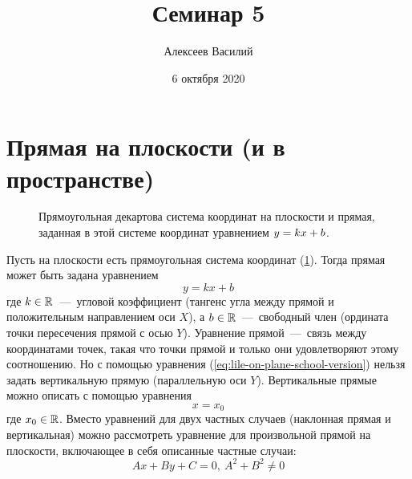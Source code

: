 \documentclass[a4paper,12pt]{article}
\author{Алексеев Василий}
\title{Семинар 5}
\date{6 октября 2020}
\begin{document}
  \maketitle
  
  \tableofcontents

  \thispagestyle{empty}
  
  \newpage
  


  \section{Прямая на плоскости (и в пространстве)}
  
  \begin{figure}[h]
    \centering
    
    
    \caption{Прямоугольная декартова система координат на плоскости и прямая, заданная в этой системе координат уравнением $y \hm= kx \hm+ b$.}
    \label{fig:line-on-plane}
  \end{figure}
  
  Пусть на плоскости есть прямоугольная система координат (\ref{fig:line-on-plane}).
  Тогда прямая может быть задана уравнением
  \begin{equation}\label{eq:lile-on-plane-school-version}
    y = kx + b
  \end{equation}
  где $k \hm\in \RR$~---~угловой коэффициент (тангенс угла между прямой и положительным направлением оси $X$),
  а $b \hm\in \RR$~---~свободный член (ордината точки пересечения прямой с осью $Y$).
  Уравнение прямой~---~связь между координатами точек, такая что точки прямой и только они удовлетворяют этому соотношению.
  Но с помощью уравнения (\ref{eq:lile-on-plane-school-version})
  нельзя задать вертикальную прямую (параллельную оси $Y$).
  Вертикальные прямые можно описать с помощью уравнения
  \[
    x = x_0
  \]
  где $x_0 \hm\in \RR$.
  Вместо уравнений для двух частных случаев (наклонная прямая и вертикальная) можно рассмотреть уравнение для произвольной прямой на плоскости, включающее в себя описанные частные случаи:
  \begin{equation}\label{eq:line-in-coord-system}
    Ax + By + C = 0,\ A^2 + B^2 \not= 0
  \end{equation}
  
\end{document}
